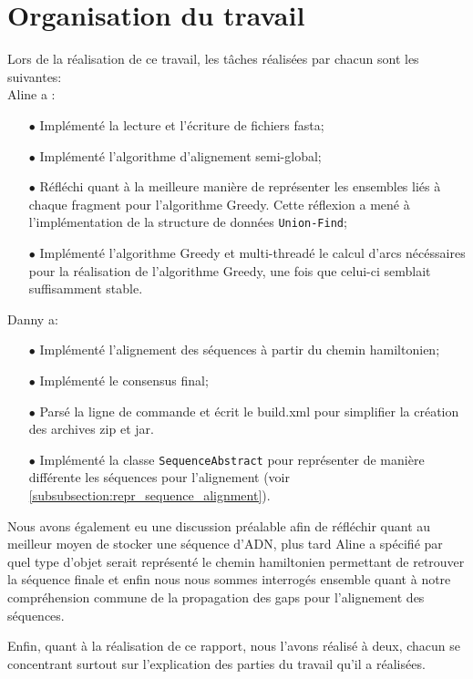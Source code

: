 \section{Organisation du travail}

Lors de la réalisation de ce travail, les tâches réalisées par chacun sont les suivantes:\\
Aline a :
\begin{itemize}
	\item[$\bullet$]Implémenté la lecture et l'écriture de fichiers fasta;
	\item[$\bullet$]Implémenté l'algorithme d'alignement semi-global;
	\item[$\bullet$]Réfléchi quant à la meilleure manière de représenter les ensembles liés à chaque fragment pour l'algorithme Greedy.
	 Cette réflexion a mené à l'implémentation de la structure de données \verb|Union-Find|;
	\item[$\bullet$]Implémenté l'algorithme Greedy et multi-threadé le calcul d'arcs nécéssaires pour la réalisation de l'algorithme Greedy, une fois que celui-ci semblait suffisamment stable.
\end{itemize}
$ $\\
Danny a:
\begin{itemize}
	\item[$\bullet$] Implémenté l'alignement des séquences à partir du chemin hamiltonien;
	\item[$\bullet$] Implémenté le consensus final;
	\item[$\bullet$] Parsé la ligne de commande et écrit le build.xml pour
		simplifier la création des archives zip et jar.
	\item[$\bullet$] Implémenté la classe \verb|SequenceAbstract| pour
		représenter de manière différente les séquences pour l'alignement
		(voir \ref{subsubsection:repr_sequence_alignment}).
\end{itemize}

Nous avons également eu une discussion préalable afin de réfléchir quant au meilleur moyen de stocker une séquence d'ADN, plus tard Aline a spécifié par quel type d'objet serait représenté le chemin hamiltonien permettant de retrouver la séquence finale et enfin nous nous sommes interrogés ensemble quant à notre compréhension commune de la propagation des gaps pour l'alignement des séquences.
\begin{comment}
De plus, Aline ayant également réfléchi à la manière d'obtenir la séquence finale à partir du chemin hamiltonien donné par l'algorithme greedy avant que Danny ne propose sa propre solution, elle a également exposé son point de vue quant à la réalisation de cette dernière étape. Le temps lui ayant manqué, son algorithme n'est pas totalement abouti et nous avons donc continué de travailler à partir de celui de Danny.
\end{comment}

Enfin, quant à la réalisation de ce rapport, nous l'avons réalisé à deux, chacun
se concentrant surtout sur l'explication des parties du travail qu'il a
réalisées.
